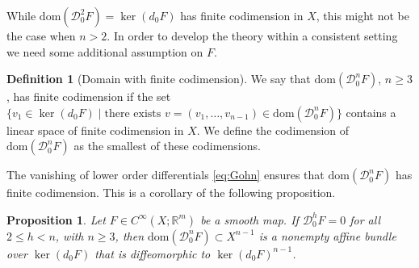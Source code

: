 \documentclass[12pt, reqno]{amsart}
\theoremstyle{plain}
\newtheorem {proposition} [theorem]{Proposition}
\theoremstyle{definition}
\newtheorem{definition}[theorem]{Definition}
\theoremstyle{remark}
\numberwithin{equation}{section}
\newcommand{\R}{\mathbb{R}}
\newcommand{\0}{\theta}
\newcommand{\1}{{-1}}
\renewcommand{\=}{\coloneqq}
\renewcommand{\.}{\dots}
\newcommand{\mc}{\mathcal}
\newcommand{\dom}{\mathrm{dom}}
\begin{document}
While  $\dom(\mc D_0^2F)=\ker(d_0F)$ has  finite codimension in $X$, this might not be the case when     $n>2$.  
In order to develop the theory within a consistent setting we need  some additional assumption on $F$.


{\color{black}
\begin{definition}[Domain with finite codimension] 
\label{FCD}
We say that $\dom(\mc D_0^n F)$, $n\geq 3$, has finite codimension if the set 
$\{ v_1 \in \ker (d_0 F )\mid 
\textrm{there exists  }v= (v_1,\ldots, v_{n-1}) \in \dom(\mc D_0^n F) \}$
contains a linear space of finite codimension in $X$. We define the codimension of $\dom(\mc D_0^n F)$ as  the smallest of these codimensions.
\end{definition}


The vanishing of lower order differentials \eqref{eq:Gohn} ensures that $\dom(\mc D_0^n F)$ has finite codimension.
This is a corollary of the following proposition.

}


\begin{proposition}\label{proposition:fincodim} Let 
$F\in C^\infty(X;\R^m)$ be a smooth map.
If $ \mc D_0^h F = 0$ for all $ 2\le h<n$, with $n\geq 3$, then 
 $\dom(\mc D_0^n F)\subset X^{n-1} $ is a nonempty affine bundle over $\ker(d_0F)$ that is diffeomorphic to 
 $\ker(d_0F)^{n-1}$.  
\end{proposition}
\end{document}
